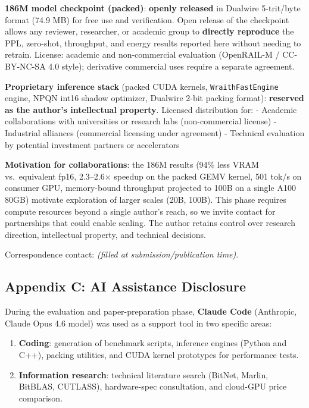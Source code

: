 \textbf{186M model checkpoint (packed)}: \textbf{openly released} in
Dualwire 5-trit/byte format (74.9 MB) for free use and verification.
Open release of the checkpoint allows any reviewer, researcher, or
academic group to \textbf{directly reproduce} the PPL, zero-shot,
throughput, and energy results reported here without needing to retrain.
License: academic and non-commercial evaluation (OpenRAIL-M /
CC-BY-NC-SA 4.0 style); derivative commercial uses require a separate
agreement.

\textbf{Proprietary inference stack} (packed CUDA kernels,
\texttt{WraithFastEngine} engine, NPQN int16 shadow optimizer, Dualwire
2-bit packing format): \textbf{reserved as the author's intellectual
property}. Licensed distribution for: - Academic collaborations with
universities or research labs (non-commercial license) - Industrial
alliances (commercial licensing under agreement) - Technical evaluation
by potential investment partners or accelerators

\textbf{Motivation for collaborations}: the 186M results (94\% less VRAM
vs.~equivalent fp16, 2.3--2.6× speedup on the packed GEMV kernel, 501
tok/s on consumer GPU, memory-bound throughput projected to 100B on a
single A100 80GB) motivate exploration of larger scales (20B, 100B).
This phase requires compute resources beyond a single author's reach, so
we invite contact for partnerships that could enable scaling. The author
retains control over research direction, intellectual property, and
technical decisions.

Correspondence contact: \emph{(filled at submission/publication time)}.

\subsection{Appendix C: AI Assistance
Disclosure}\label{appendix-c-ai-assistance-disclosure}

During the evaluation and paper-preparation phase, \textbf{Claude Code}
(Anthropic, Claude Opus 4.6 model) was used as a support tool in two
specific areas:

\begin{enumerate}
\def\labelenumi{\arabic{enumi}.}
\tightlist
\item
  \textbf{Coding}: generation of benchmark scripts, inference engines
  (Python and C++), packing utilities, and CUDA kernel prototypes for
  performance tests.
\item
  \textbf{Information research}: technical literature search (BitNet,
  Marlin, BitBLAS, CUTLASS), hardware-spec consultation, and cloud-GPU
  price comparison.
\end{enumerate}

